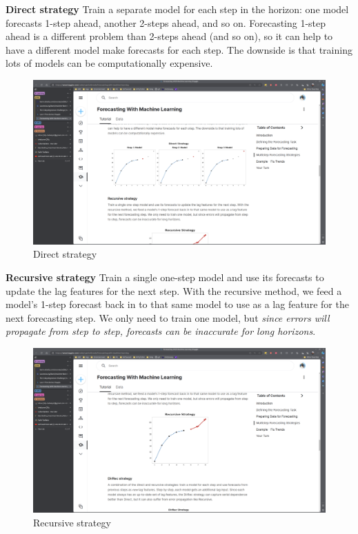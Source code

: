 \documentclass[12pt]{report}
\begin{document}
\textbf{Direct strategy} Train a separate model for each step in the horizon: one model forecasts 1-step ahead, another 2-steps ahead, and so on. Forecasting 1-step ahead is a different problem than 2-steps ahead (and so on), so it can help to have a different model make forecasts for each step. The downside is that training lots of models can be computationally expensive.

\begin{figure}[htbp]
  \begin{center}
    \includegraphics[trim =24cm 17.0cm 22cm 20cm, clip, scale=0.4]{pics/forecast2.png}
    \caption{Direct strategy}
    \label{fig:direct}
  \end{center}
\end{figure}

\textbf{Recursive strategy} Train a single one-step model and use its forecasts to update the lag features for the next step. With the recursive method, we feed a model's 1-step forecast back in to that same model to use as a lag feature for the next forecasting step. We only need to train one model, but \textit{since errors will propagate from step to step, forecasts can be inaccurate for long horizons}.

\begin{figure}[htbp]
  \begin{center}
    \includegraphics[trim =30cm 14.0cm 28cm 19cm, clip, scale=0.4]{pics/forecast3.png}
    \caption{Recursive strategy}
    \label{fig:recursive}
  \end{center}
\end{figure}
\end{document}
